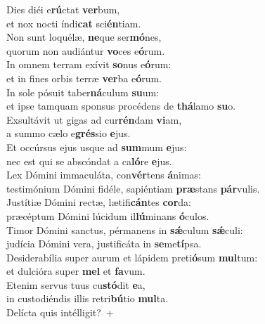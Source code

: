 \evenverse Dies diéi e\textbf{rú}ctat \textbf{ver}bum,~\*\\
\evenverse et nox nocti índi\textbf{cat} sci\textbf{én}tiam.\\
\oddverse Non sunt loquélæ, \textbf{ne}que ser\textbf{mó}nes,~\*\\
\oddverse quorum non audiántur \textbf{vo}ces e\textbf{ó}rum.\\
\evenverse In omnem terram exívit \textbf{so}nus e\textbf{ó}rum:~\*\\
\evenverse et in fines orbis terræ \textbf{ver}ba e\textbf{ó}rum.\\
\oddverse In sole pósuit taber\textbf{ná}culum \textbf{su}um:~\*\\
\oddverse et ipse tamquam sponsus procédens de \textbf{thá}lamo \textbf{su}o.\\
\evenverse Exsultávit ut gigas ad cur\textbf{rén}dam \textbf{vi}am,~\*\\
\evenverse a summo cælo e\textbf{grés}sio \textbf{e}jus.\\
\oddverse Et occúrsus ejus usque ad \textbf{sum}mum \textbf{e}jus:~\*\\
\oddverse nec est qui se abscóndat a ca\textbf{ló}re \textbf{e}jus.\\
\evenverse Lex Dómini immaculáta, con\textbf{vér}tens \textbf{á}nimas:~\*\\
\evenverse testimónium Dómini fidéle, sapiéntiam \textbf{præ}stans \textbf{pár}vulis.\\
\oddverse Justítiæ Dómini rectæ, lætifi\textbf{cán}tes \textbf{cor}da:~\*\\
\oddverse præcéptum Dómini lúcidum il\textbf{lú}minans \textbf{ó}culos.\\
\evenverse Timor Dómini sanctus, pérmanens in \textbf{sǽ}culum \textbf{sǽ}culi:~\*\\
\evenverse judícia Dómini vera, justificáta in \textbf{se}me\textbf{tí}psa.\\
\oddverse Desiderabília super aurum et lápidem preti\textbf{ó}sum \textbf{mul}tum:~\*\\
\oddverse et dulcióra super \textbf{mel} et \textbf{fa}vum.\\
\evenverse Etenim servus tuus cu\textbf{stó}dit \textbf{e}a,~\*\\
\evenverse in custodiéndis illis retri\textbf{bú}tio \textbf{mul}ta.\\
\oddverse Delícta quis intélligit?~+\\
